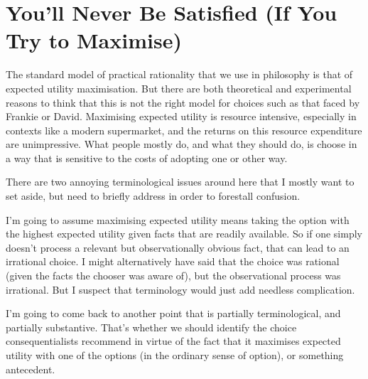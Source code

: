 \documentclass[
  10pt,
  letterpaper,
  twoside]{scrbook}
\begin{document}
\section{You'll Never Be Satisfied (If You Try to
Maximise)}\label{sec-satisfied}

The standard model of practical rationality that we use in philosophy is
that of expected utility maximisation. But there are both theoretical
and experimental reasons to think that this is not the right model for
choices such as that faced by Frankie or David. Maximising expected
utility is resource intensive, especially in contexts like a modern
supermarket, and the returns on this resource expenditure are
unimpressive. What people mostly do, and what they should do, is choose
in a way that is sensitive to the costs of adopting one or other way.

There are two annoying terminological issues around here that I mostly
want to set aside, but need to briefly address in order to forestall
confusion.

I'm going to assume maximising expected utility means taking the option
with the highest expected utility given facts that are readily
available. So if one simply doesn't process a relevant but
observationally obvious fact, that can lead to an irrational choice. I
might alternatively have said that the choice was rational (given the
facts the chooser was aware of), but the observational process was
irrational. But I suspect that terminology would just add needless
complication.

I'm going to come back to another point that is partially
terminological, and partially substantive. That's whether we should
identify the choice consequentialists recommend in virtue of the fact
that it maximises expected utility with one of the options (in the
ordinary sense of option), or something antecedent.
\end{document}

